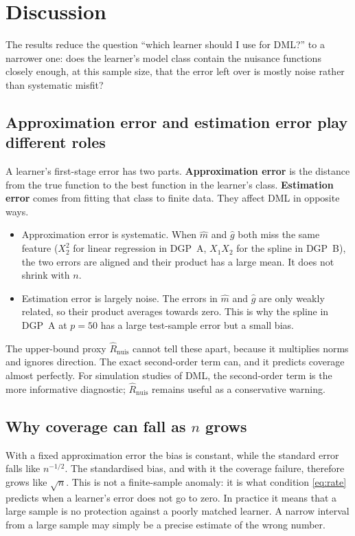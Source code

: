 \documentclass[11pt,a4paper]{article}
\newcommand{\Rnuis}{\hat R_{\mathrm{nuis}}}
\begin{document}
\section{Discussion}\label{sec:disc}

The results reduce the question ``which learner should I use for DML?'' to a narrower one: does the learner's model class contain the nuisance functions closely enough, at this sample size, that the error left over is mostly noise rather than systematic misfit?

\subsection{Approximation error and estimation error play different roles}

A learner's first-stage error has two parts. \textbf{Approximation error} is the distance from the true function to the best function in the learner's class. \textbf{Estimation error} comes from fitting that class to finite data. They affect DML in opposite ways.
\begin{itemize}
\item Approximation error is systematic. When $\hat m$ and $\hat g$ both miss the same feature ($X_2^2$ for linear regression in DGP~A, $X_1X_2$ for the spline in DGP~B), the two errors are aligned and their product has a large mean. It does not shrink with $n$.
\item Estimation error is largely noise. The errors in $\hat m$ and $\hat g$ are only weakly related, so their product averages towards zero. This is why the spline in DGP~A at $p=50$ has a large test-sample error but a small bias.
\end{itemize}
The upper-bound proxy $\Rnuis$ cannot tell these apart, because it multiplies norms and ignores direction. The exact second-order term can, and it predicts coverage almost perfectly. For simulation studies of DML, the second-order term is the more informative diagnostic; $\Rnuis$ remains useful as a conservative warning.

\subsection{\texorpdfstring{Why coverage can fall as $n$ grows}{Why coverage can fall as n grows}}

With a fixed approximation error the bias is constant, while the standard error falls like $n^{-1/2}$. The standardised bias, and with it the coverage failure, therefore grows like $\sqrt n$. This is not a finite-sample anomaly: it is what condition \eqref{eq:rate} predicts when a learner's error does not go to zero. In practice it means that a large sample is no protection against a poorly matched learner. A narrow interval from a large sample may simply be a precise estimate of the wrong number.
\end{document}
